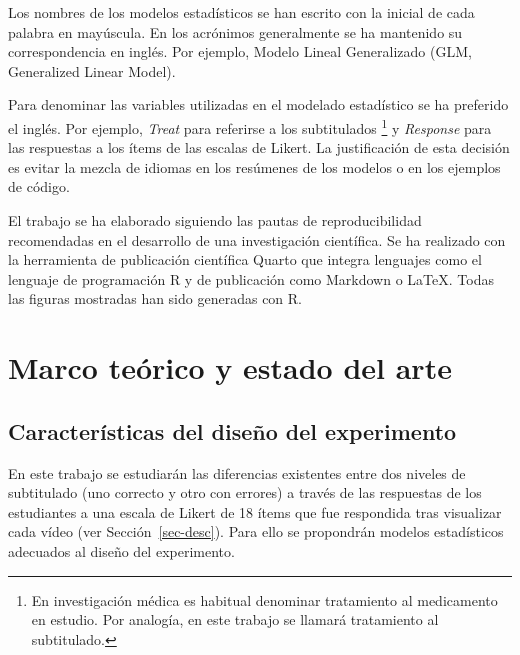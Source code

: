 \documentclass[
  12pt,
  a4paper,
  extrafontsizes,
  onecolumn,
  openright,
  table]{memoir}
\begin{document}
Los nombres de los modelos estadísticos se han escrito con la inicial de
cada palabra en mayúscula. En los acrónimos generalmente se ha mantenido
su correspondencia en inglés. Por ejemplo, Modelo Lineal Generalizado
(GLM, Generalized Linear Model).

Para denominar las variables utilizadas en el modelado estadístico se ha
preferido el inglés. Por ejemplo, \emph{Treat} para referirse a los
subtitulados \footnote{En investigación médica es habitual denominar
  tratamiento al medicamento en estudio. Por analogía, en este trabajo
  se llamará tratamiento al subtitulado.} y \emph{Response} para las
respuestas a los ítems de las escalas de Likert. La justificación de
esta decisión es evitar la mezcla de idiomas en los resúmenes de los
modelos o en los ejemplos de código.

El trabajo se ha elaborado siguiendo las pautas de reproducibilidad
recomendadas en el desarrollo de una investigación científica. Se ha
realizado con la herramienta de publicación científica Quarto que
integra lenguajes como el lenguaje de programación \gls{R} y de
publicación como Markdown o \LaTeX. Todas las figuras mostradas han sido
generadas con R.


\hypertarget{sec-arte}{%
\chapter{Marco teórico y estado del arte}\label{sec-arte}}

\hypertarget{caracteruxedsticas-del-diseuxf1o-del-experimento}{%
\section{Características del diseño del
experimento}\label{caracteruxedsticas-del-diseuxf1o-del-experimento}}

En este trabajo se estudiarán las diferencias existentes entre dos
niveles de subtitulado (uno correcto y otro con errores) a través de las
respuestas de los estudiantes a una escala de Likert de 18 ítems que fue
respondida tras visualizar cada vídeo (ver Sección~\ref{sec-desc}). Para
ello se propondrán modelos estadísticos adecuados al diseño del
experimento.
\end{document}
